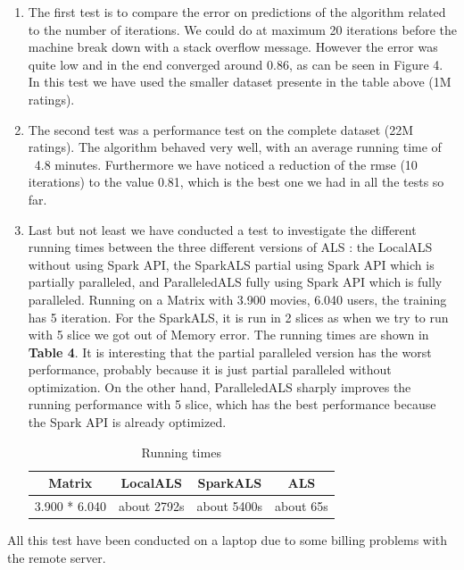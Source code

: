 \documentclass{sig-alternate-05-2015}
\begin{document}
\begin{enumerate}
    \item The first test is to compare the error on predictions of the algorithm related to the number of iterations.
        We could do at maximum 20 iterations before the machine break down with a stack overflow message. However the error
        was quite low and in the end converged around 0.86, as can be seen in Figure 4. In this test we have used the smaller
        dataset presente in the table above (1M ratings).
    \item The second test was a performance test on the complete dataset (22M ratings). The algorithm behaved very well, with an average
    running time of ~4.8 minutes. Furthermore we have noticed a reduction of the rmse (10 iterations) to the value 0.81, which is the best one
    we had in all the tests so far.
    \item Last but not least we have conducted a test to investigate the different running times between the three different versions of ALS : the LocalALS without using Spark API, the SparkALS partial using Spark API which is partially paralleled, and ParalleledALS fully using Spark API which is fully paralleled. Running on a Matrix with 3.900 movies, 6.040 users, the training has 5 iteration. For the SparkALS, it is run in 2 slices as when we try to run with 5 slice we got out of Memory error. The running times are shown in \textbf{Table 4}. It is interesting that the partial paralleled version has the worst performance, probably because it is just partial paralleled without optimization. On the other hand, ParalleledALS sharply improves the running performance with 5 slice, which has the best performance because the Spark API is already optimized.
\begin{table}
\centering
\caption{Running times}
\begin{tabular}{|c|c|c|c|} \hline
\textbf{Matrix}  & \textbf{LocalALS} & \textbf{SparkALS} & \textbf{ALS }\\ \hline
3.900 * 6.040 & about 2792s  & about 5400s & about 65s\\ \hline
\end{tabular}
\end{table}
\end{enumerate}
All this test have been conducted on a laptop due to some billing problems with the remote server.
\end{document}
